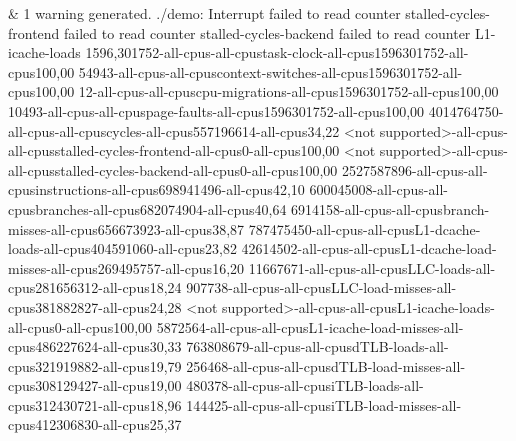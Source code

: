 &
1 warning generated. ./demo: Interrupt failed to read counter stalled-cycles-frontend failed to read counter stalled-cycles-backend failed to read counter L1-icache-loads 1596,301752-all-cpus-all-cpustask-clock-all-cpus1596301752-all-cpus100,00 54943-all-cpus-all-cpuscontext-switches-all-cpus1596301752-all-cpus100,00 12-all-cpus-all-cpuscpu-migrations-all-cpus1596301752-all-cpus100,00 10493-all-cpus-all-cpuspage-faults-all-cpus1596301752-all-cpus100,00 4014764750-all-cpus-all-cpuscycles-all-cpus557196614-all-cpus34,22 <not supported>-all-cpus-all-cpusstalled-cycles-frontend-all-cpus0-all-cpus100,00 <not supported>-all-cpus-all-cpusstalled-cycles-backend-all-cpus0-all-cpus100,00 2527587896-all-cpus-all-cpusinstructions-all-cpus698941496-all-cpus42,10 600045008-all-cpus-all-cpusbranches-all-cpus682074904-all-cpus40,64 6914158-all-cpus-all-cpusbranch-misses-all-cpus656673923-all-cpus38,87 787475450-all-cpus-all-cpusL1-dcache-loads-all-cpus404591060-all-cpus23,82 42614502-all-cpus-all-cpusL1-dcache-load-misses-all-cpus269495757-all-cpus16,20 11667671-all-cpus-all-cpusLLC-loads-all-cpus281656312-all-cpus18,24 907738-all-cpus-all-cpusLLC-load-misses-all-cpus381882827-all-cpus24,28 <not supported>-all-cpus-all-cpusL1-icache-loads-all-cpus0-all-cpus100,00 5872564-all-cpus-all-cpusL1-icache-load-misses-all-cpus486227624-all-cpus30,33 763808679-all-cpus-all-cpusdTLB-loads-all-cpus321919882-all-cpus19,79 256468-all-cpus-all-cpusdTLB-load-misses-all-cpus308129427-all-cpus19,00 480378-all-cpus-all-cpusiTLB-loads-all-cpus312430721-all-cpus18,96 144425-all-cpus-all-cpusiTLB-load-misses-all-cpus412306830-all-cpus25,37
